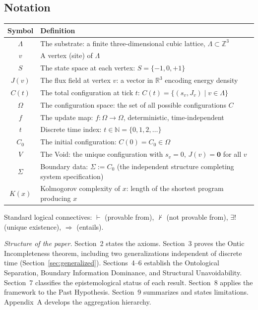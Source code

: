 \documentclass[12pt]{article}
\theoremstyle{plain}
\theoremstyle{definition}
\theoremstyle{remark}
\newcommand{\Lattice}{\Lambda}
\newcommand{\Real}{\mathbb{R}}
\newcommand{\Integer}{\mathbb{Z}}
\newcommand{\Natural}{\mathbb{N}}
\begin{document}
\subsection{Notation}

\begin{table}[H]
\centering\small
\begin{tabular}{@{}cp{10.5cm}@{}}
\toprule
\textbf{Symbol} & \textbf{Definition} \\
\midrule
$\Lattice$ & The substrate: a finite three-dimensional cubic lattice, $\Lattice \subset \Integer^3$ \\
$v$ & A vertex (site) of $\Lattice$ \\
$S$ & The state space at each vertex: $S = \{-1, 0, +1\}$ \\
$J(v)$ & The flux field at vertex $v$: a vector in $\Real^3$ encoding energy density \\
$C(t)$ & The total configuration at tick $t$: $C(t) = \{(s_v, J_v) \mid v \in \Lattice\}$ \\
$\Omega$ & The configuration space: the set of all possible configurations $C$ \\
$f$ & The update map: $f \colon \Omega \to \Omega$, deterministic, time-independent \\
$t$ & Discrete time index: $t \in \Natural = \{0, 1, 2, \ldots\}$ \\
$C_0$ & The initial configuration: $C(0) = C_0 \in \Omega$ \\
$V$ & The Void: the unique configuration with $s_v = 0$, $J(v) = \mathbf{0}$ for all $v$ \\
$\Sigma$ & Boundary data: $\Sigma := C_0$ (the independent structure completing system specification) \\
$K(x)$ & Kolmogorov complexity of $x$: length of the shortest program producing $x$ \\
\bottomrule
\end{tabular}
\end{table}

\noindent Standard logical connectives: $\vdash$ (provable from), $\nvdash$ (not provable from), $\exists!$ (unique existence), $\Rightarrow$ (entails).

\medskip
\noindent\textit{Structure of the paper.} Section~2 states the axioms. Section~3 proves the Ontic Incompleteness theorem, including two generalizations independent of discrete time (Section~\ref{sec:generalized}). Sections~4--6 establish the Ontological Separation, Boundary Information Dominance, and Structural Unavoidability. Section~7 classifies the epistemological status of each result. Section~8 applies the framework to the Past Hypothesis. Section~9 summarizes and states limitations. Appendix~A develops the aggregation hierarchy.
\end{document}
